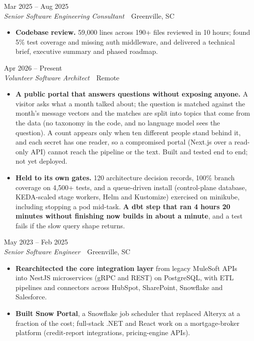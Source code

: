 \documentclass[10pt,letterpaper]{article}
\newcommand{\szmeta}{\fontsize{8pt}{10pt}\selectfont}
\begin{document}
\vspace{3pt}
 \hfill {\color{muted}\szmeta Mar 2025 – Aug 2025}\\[1pt]
{\itshape Senior Software Engineering Consultant}{\color{muted}\ \textbullet\ Greenville, SC}
\vspace{2pt}
\begin{itemize}
\item \textbf{Codebase review.} 59,000 lines across 190+ files reviewed in 10 hours; found 5\% test coverage and missing auth middleware, and delivered a technical brief, executive summary and phased roadmap.
\end{itemize}
\vspace{3pt}
 \hfill {\color{muted}\szmeta Apr 2026 – Present}\\[1pt]
{\itshape Volunteer Software Architect}{\color{muted}\ \textbullet\ Remote}
\vspace{2pt}
\begin{itemize}
\item \textbf{A public portal that answers questions without exposing anyone.} A visitor asks what a month talked about; the question is matched against the month's message vectors and the matches are split into topics that come from the data (no taxonomy in the code, and no language model sees the question). A count appears only when ten different people stand behind it, and each secret has one reader, so a compromised portal (Next.js over a read-only API) cannot reach the pipeline or the text. Built and tested end to end; not yet deployed.
\item \textbf{Held to its own gates.} 120 architecture decision records, 100\% branch coverage on 4,500+ tests, and a queue-driven install (control-plane database, KEDA-scaled stage workers, Helm and Kustomize) exercised on minikube, including stopping a pod mid-task. \textbf{A dbt step that ran 4 hours 20 minutes without finishing now builds in about a minute}, and a test fails if the slow query shape returns.
\end{itemize}
\vspace{3pt}
 \hfill {\color{muted}\szmeta May 2023 – Feb 2025}\\[1pt]
{\itshape Senior Software Engineer}{\color{muted}\ \textbullet\ Greenville, SC}
\vspace{2pt}
\begin{itemize}
\item \textbf{Rearchitected the core integration layer} from legacy MuleSoft APIs into NestJS microservices (gRPC and REST) on PostgreSQL, with ETL pipelines and connectors across HubSpot, SharePoint, Snowflake and Salesforce.
\item \textbf{Built Snow Portal}, a Snowflake job scheduler that replaced Alteryx at a fraction of the cost; full-stack .NET and React work on a mortgage-broker platform (credit-report integrations, pricing-engine APIs).
\end{itemize}
\end{document}
